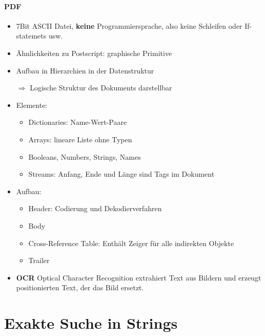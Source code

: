 \documentclass{article}
\begin{document}
\paragraph{PDF}
\begin{itemize}
\item 7Bit ASCII Datei, \textbf{keine} Programmiersprache, also keine Schleifen oder If-statemets usw.
\item Ähnlichkeiten zu Postscript: graphische Primitive
\item Aufbau in Hierarchien in der Datenstruktur
\item[$\Rightarrow$] Logische Struktur des Dokuments darstellbar
\item Elemente:
\begin{itemize}
\item Dictionaries: Name-Wert-Paare
\item Arrays: lineare Liste ohne Typen
\item Booleans, Numbers, Strings, Names
\item Streams: Anfang, Ende und Länge sind Tags im Dokument
\end{itemize}
\item Aufbau:
\begin{itemize}
\item Header: Codierung und Dekodierverfahren
\item Body
\item Cross-Reference Table: Enthält Zeiger für alle indirekten Objekte
\item Trailer
\end{itemize}
\item \textbf{OCR} Optical Character Recognition extrahiert Text aus Bildern und erzeugt positionierten Text, der das Bild ersetzt.



\end{itemize}



\newpage
\section{Exakte Suche in Strings}
\end{document}
